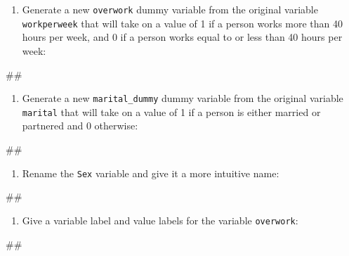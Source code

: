 \documentclass[
]{book}
\newenvironment{Shaded}{\begin{snugshade}}{\end{snugshade}}
\newcommand{\NormalTok}[1]{#1}
\providecommand{\tightlist}{%
  \setlength{\itemsep}{0pt}\setlength{\parskip}{0pt}}
\begin{document}
\begin{enumerate}
\def\labelenumi{\arabic{enumi}.}
\setcounter{enumi}{2}
\tightlist
\item
  Generate a new \texttt{overwork} dummy variable from the original variable \texttt{workperweek} that will take on a value of 1 if a person works more than 40 hours per week, and 0 if a person works equal to or less than 40 hours per week:
\end{enumerate}

\begin{Shaded}
\begin{Highlighting}[]
\NormalTok{\#\#}
\end{Highlighting}
\end{Shaded}

\begin{enumerate}
\def\labelenumi{\arabic{enumi}.}
\setcounter{enumi}{3}
\tightlist
\item
  Generate a new \texttt{marital\_dummy} dummy variable from the original variable \texttt{marital} that will take on a value of 1 if a person is either married or partnered and 0 otherwise:
\end{enumerate}

\begin{Shaded}
\begin{Highlighting}[]
\NormalTok{\#\#}
\end{Highlighting}
\end{Shaded}

\begin{enumerate}
\def\labelenumi{\arabic{enumi}.}
\setcounter{enumi}{4}
\tightlist
\item
  Rename the \texttt{Sex} variable and give it a more intuitive name:
\end{enumerate}

\begin{Shaded}
\begin{Highlighting}[]
\NormalTok{\#\#}
\end{Highlighting}
\end{Shaded}

\begin{enumerate}
\def\labelenumi{\arabic{enumi}.}
\setcounter{enumi}{5}
\tightlist
\item
  Give a variable label and value labels for the variable \texttt{overwork}:
\end{enumerate}

\begin{Shaded}
\begin{Highlighting}[]
\NormalTok{\#\#}
\end{Highlighting}
\end{Shaded}
\end{document}
